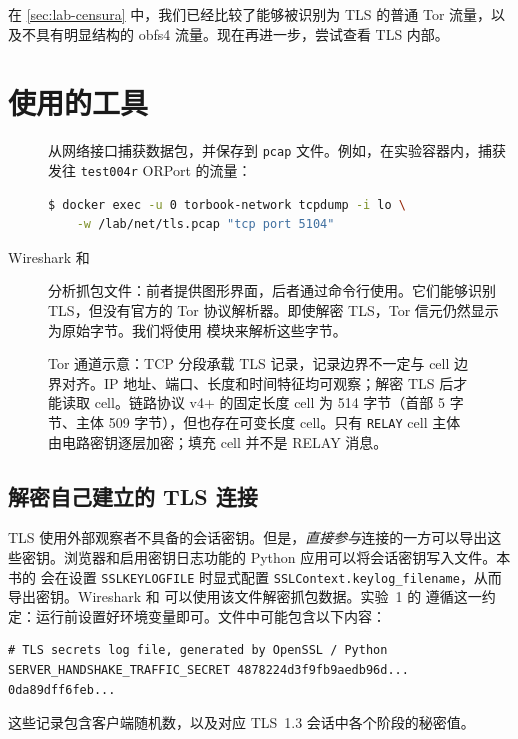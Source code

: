 在 \cref{sec:lab-censura} 中，我们已经比较了能够被识别为 TLS 的普通 Tor 流量，以及不具有明显结构的 obfs4 流量。现在再进一步，尝试查看 TLS 内部。

\section{使用的工具}\label{sec:traffico-strumenti}

\begin{description}
  \item[] 从网络接口捕获数据包，并保存到 \texttt{pcap} 文件。例如，在实验容器内，捕获发往 \texttt{test004r} ORPort 的流量：
\begin{lstlisting}[language=bash,numbers=none]
$ docker exec -u 0 torbook-network tcpdump -i lo \
    -w /lab/net/tls.pcap "tcp port 5104"
\end{lstlisting}
  \item[Wireshark 和 ] 分析抓包文件：前者提供图形界面，后者通过命令行使用。它们能够识别 TLS，但没有官方的 Tor 协议解析器。即使解密 TLS，Tor 信元仍然显示为原始字节。我们将使用  模块来解析这些字节。
\end{description}

\begin{figure}[htbp]
\centering

\caption{Tor 通道示意：TCP 分段承载 TLS 记录，记录边界不一定与 cell 边界对齐。IP 地址、端口、长度和时间特征均可观察；解密 TLS 后才能读取 cell。链路协议 v4+ 的固定长度 cell 为 514 字节（首部 5 字节、主体 509 字节），但也存在可变长度 cell。只有 \texttt{RELAY} cell 主体由电路密钥逐层加密；填充 cell 并不是 RELAY 消息。}
\label{fig:incapsulamento}
\end{figure}

\subsection{解密自己建立的 TLS 连接}

TLS 使用外部观察者不具备的会话密钥。但是，\emph{直接参与}连接的一方可以导出这些密钥。浏览器和启用密钥日志功能的 Python 应用可以将会话密钥写入文件。本书的  会在设置 \texttt{SSLKEYLOGFILE} 时显式配置 \texttt{SSLContext.keylog\_filename}，从而导出密钥。Wireshark 和  可以使用该文件解密抓包数据。实验~1 的  遵循这一约定：运行前设置好环境变量即可。文件中可能包含以下内容：
\begin{lstlisting}[numbers=none]
# TLS secrets log file, generated by OpenSSL / Python
SERVER_HANDSHAKE_TRAFFIC_SECRET 4878224d3f9fb9aedb96d... 0da89dff6feb...
\end{lstlisting}
这些记录包含客户端随机数，以及对应 TLS~1.3 会话中各个阶段的秘密值。

